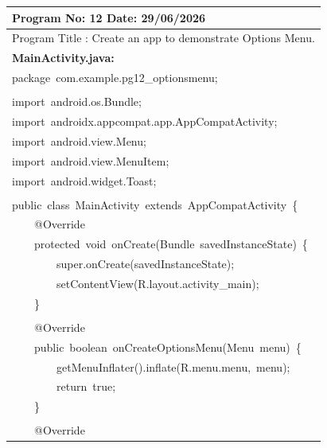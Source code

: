 \documentclass[a4paper,12pt]{article}
\begin{document}
\newpage

\noindent\begingroup
\renewcommand{\arraystretch}{1.1}
\begin{longtable}{|p{}|}
\hline\endfirsthead\hline\endhead\hline\endfoot\hline\endlastfoot
\rule{0pt}{13pt}Program No: 12 \hfill Date: 29/06/2026 \\
\hline
\rule{0pt}{13pt}Program Title : Create an app to demonstrate Options Menu. \\
\hline
\rule{0pt}{13pt}\textbf{MainActivity.java:} \\
\hline
{\ttfamily\small package\ com.example.pg12\_optionsmenu;} \\
\strut \\
{\ttfamily\small import\ android.os.Bundle;} \\
{\ttfamily\small import\ androidx.appcompat.app.AppCompatActivity;} \\
{\ttfamily\small import\ android.view.Menu;} \\
{\ttfamily\small import\ android.view.MenuItem;} \\
{\ttfamily\small import\ android.widget.Toast;} \\
\strut \\
{\ttfamily\small public\ class\ MainActivity\ extends\ AppCompatActivity\ \{} \\
{\ttfamily\small \ \ \ \ @Override} \\
{\ttfamily\small \ \ \ \ protected\ void\ onCreate(Bundle\ savedInstanceState)\ \{} \\
{\ttfamily\small \ \ \ \ \ \ \ \ super.onCreate(savedInstanceState);} \\
{\ttfamily\small \ \ \ \ \ \ \ \ setContentView(R.layout.activity\_main);} \\
{\ttfamily\small \ \ \ \ \}} \\
\strut \\
{\ttfamily\small \ \ \ \ @Override} \\
{\ttfamily\small \ \ \ \ public\ boolean\ onCreateOptionsMenu(Menu\ menu)\ \{} \\
{\ttfamily\small \ \ \ \ \ \ \ \ getMenuInflater().inflate(R.menu.menu,\ menu);} \\
{\ttfamily\small \ \ \ \ \ \ \ \ return\ true;} \\
{\ttfamily\small \ \ \ \ \}} \\
\strut \\
{\ttfamily\small \ \ \ \ @Override} \\

\end{longtable}
\end{document}
